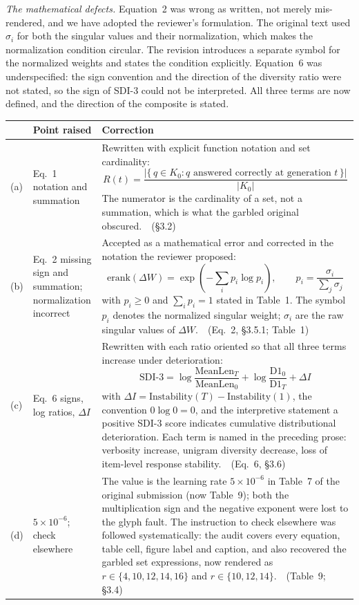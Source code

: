 \documentclass[11pt,a4paper]{article}
\newcommand{\newtext}[1]{#1}
\newcommand{\newtext}[1]{\textcolor{chgcolor}{``#1''}}
\newcommand{\renum}[2]{#1 of the original submission (now #2)}
\begin{document}
\medskip\noindent\emph{The mathematical defects.}
Equation~2 was wrong as written, not merely mis-rendered, and we have
adopted the reviewer's formulation. The original text used $\sigma_i$
for both the singular values and their normalization, which makes the
normalization condition circular. The revision introduces a separate
symbol for the normalized weights and states the condition explicitly.
Equation~6 was underspecified: the sign convention and the direction of
the diversity ratio were not stated, so the sign of SDI-3 could not be
interpreted. All three terms are now defined, and the direction of the
composite is stated.

\medskip
\renewcommand{\arraystretch}{1.3}
\begin{longtable}{@{}L{0.5cm}L{3.0cm}L{10.6cm}@{}}
\toprule
{} & \textbf{Point raised} & \textbf{Correction} \\
\midrule
\endfirsthead
\bottomrule
\endfoot

(a) & Eq.~1 notation and summation &
Rewritten with explicit function notation and set cardinality:
\[
  R(t) = \frac{\bigl|\{\, q \in K_0 :
          q \text{ answered correctly at generation } t \,\}\bigr|}
         {|K_0|}
\]
The numerator is the cardinality of a set, not a summation, which is
what the garbled original obscured.\ \ (\S3.2) \\

(b) & Eq.~2 missing sign and summation; normalization incorrect &
Accepted as a mathematical error and corrected in the notation the
reviewer proposed:
\[
  \mathrm{erank}(\Delta W) = \exp\!\left(-\sum_i p_i \log p_i\right),
  \qquad p_i = \frac{\sigma_i}{\sum_j \sigma_j}
\]
with \newtext{$p_i \ge 0$ and $\sum_i p_i = 1$} stated in Table~1. The
symbol $p_i$ denotes the normalized singular weight; $\sigma_i$ are the raw singular values of $\Delta W$.\ \
(Eq.~2, \S3.5.1; Table~1) \\

(c) & Eq.~6 signs, log ratios, $\Delta I$ &
Rewritten with each ratio oriented so that all three terms increase
under deterioration:
\[
  \mathrm{SDI\text{-}3} =
  \log\frac{\mathrm{MeanLen}_T}{\mathrm{MeanLen}_0}
  + \log\frac{\mathrm{D1}_0}{\mathrm{D1}_T}
  + \Delta I
\]
with $\Delta I = \mathrm{Instability}(T) - \mathrm{Instability}(1)$, the
convention $0\log 0 = 0$, and the interpretive statement
\newtext{a positive SDI-3 score indicates cumulative distributional
deterioration}. Each term is named in the preceding prose: verbosity
increase, unigram diversity decrease, loss of item-level response
stability.\ \ (Eq.~6, \S3.6) \\

(d) & $5\times10^{-6}$; check elsewhere &
The value is the learning rate $5\times10^{-6}$ in
\renum{Table~7}{Table~9}; both the multiplication sign and the
negative exponent were lost to the glyph fault. The instruction to check
elsewhere was followed systematically: the audit covers every equation,
table cell, figure label and caption, and also recovered the garbled set
expressions, now rendered as $r \in \{4, 10, 12, 14, 16\}$ and
$r \in \{10, 12, 14\}$.\ \ (Table~9; \S3.4) \\
\end{longtable}
\end{document}
